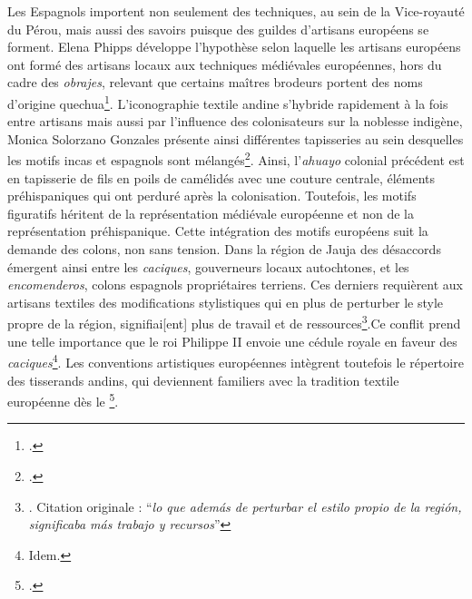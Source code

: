 Les Espagnols importent non seulement des techniques, au sein de la Vice-royauté du Pérou, mais aussi des savoirs puisque des guildes d'artisans européens se forment. Elena Phipps développe l'hypothèse selon laquelle les artisans européens ont formé des artisans locaux aux techniques médiévales européennes, hors du cadre des \textit{obrajes}, relevant que certains maîtres brodeurs portent des noms d'origine quechua\footcite[p.~37]{phippsIberianGlobe2013}. 
L'iconographie textile andine s'hybride rapidement à la fois entre artisans mais aussi par l'influence des colonisateurs sur la noblesse indigène, Monica Solorzano Gonzales présente ainsi différentes tapisseries au sein desquelles les motifs incas et espagnols sont mélangés\footcite[p.~499-500]{solorzanogonzalesTapizAndinoNobleza2020}. Ainsi, l'\textit{ahuayo} colonial précédent est en tapisserie de fils en poils de camélidés avec une couture centrale, éléments préhispaniques qui ont perduré après la colonisation. Toutefois, les motifs figuratifs héritent de la représentation médiévale européenne et non de la représentation préhispanique.
Cette intégration des motifs européens suit la demande des colons, non sans tension. Dans la région de Jauja des désaccords émergent ainsi entre les \textit{caciques}, gouverneurs locaux autochtones, et les \textit{encomenderos}, colons espagnols propriétaires terriens. Ces derniers requièrent aux artisans textiles des modifications stylistiques qui \og en plus de perturber le style propre de la région, signifiai[ent] plus de travail et de ressources\footnote{\cite[p.~124]{ramosTejidosSociedadColonial2010}. Citation originale : \textquotedblleft \textit{lo que además de perturbar el estilo propio de la región, significaba más trabajo y recursos}\textquotedblright}.\fg \:Ce conflit prend une telle importance que le roi Philippe II envoie une cédule royale en faveur des \textit{caciques}\footnote{Idem.}. Les conventions artistiques européennes intègrent toutefois le répertoire des tisserands andins, qui deviennent familiers avec la tradition textile européenne dès le \footcite[p.~60]{nilesArtistEmpireInca1994}. \\


